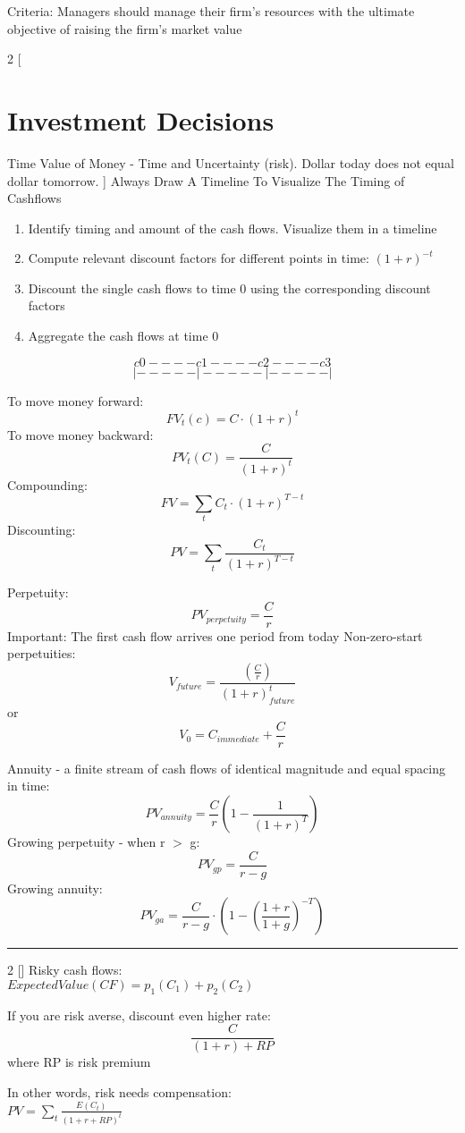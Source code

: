 \documentclass[8pt]{report}
\begin{document}
Criteria: Managers should manage their firm’s resources with the
ultimate objective of raising the firm’s market value

\begin{multicols}{2}
[
\section{Investment Decisions}
Time Value of Money - Time and Uncertainty (risk). Dollar today does not equal dollar tomorrow.
]
Always Draw A Timeline To Visualize The Timing of Cashflows
\begin{enumerate}
\item Identify timing and amount of the cash flows. Visualize them in a
timeline
\item Compute relevant discount factors for different points in time: $(1 + r)^{-t}$
\item Discount the single cash flows to time 0 using the corresponding
discount factors
\item Aggregate the cash flows at time 0
\end{enumerate}

$$c0----c1----c2----c3$$
$$|-----|-----|-----|$$


To move money forward: $$FV_t(c) = C \cdot (1+r)^t$$ 
To move money backward: $$PV_t(C) = \frac{C}{(1+r)^t}$$
Compounding: $$FV = \sum_t C_t \cdot (1+r)^{T-t}$$
Discounting: $$PV = \sum_t \frac{C_t}{(1+r)^{T-t}}$$

Perpetuity: $$PV_{perpetuity} = \frac{C}{r}$$
Important: The first cash flow arrives one period from today
Non-zero-start perpetuities: $$V_{future} = \frac{(\frac{C}{r})}{(1+r)^t_{future}}$$ or $$V_0 = C_{immediate} + \frac{C}{r}$$

Annuity - a finite stream of cash flows of identical
magnitude and equal spacing in time: $$ PV_{annuity} = \frac{C}{r} ( 1-\frac{1}{(1+r)^T} ) $$
Growing perpetuity - when r $>$ g: $$ PV_{gp} = \frac{C}{r-g} $$
Growing annuity: $$ PV_{ga} = \frac{C}{r-g} \cdot (1 - (\frac{1+r}{1+g})^{-T}) $$ 
\end{multicols}
\hrule
\begin{multicols}{2}
[] 
Risky cash flows: \\
$ExpectedValue(CF) = p_1(C_1) + p_2(C_2)$

If you are risk averse, discount even higher rate: \\
$$\frac{C}{(1+r)+RP}$$ where RP is risk premium

In other words, risk needs compensation: \\
$PV = \sum_t \frac{E(C_t)}{(1+r+RP)^t}$

\end{multicols}
\end{document}
